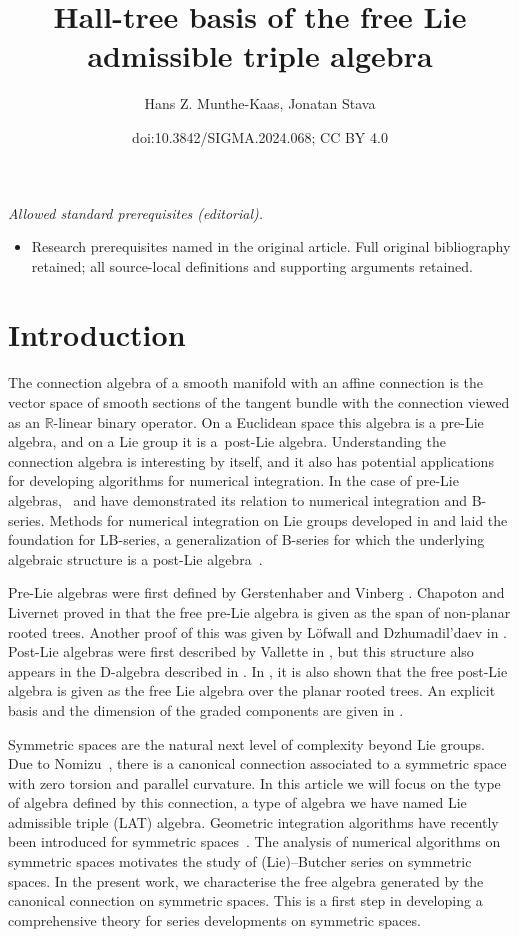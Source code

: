 \documentclass[10pt,a4paper]{amsart}
\title{Hall-tree basis of the free Lie admissible triple algebra}
\author{Hans Z. Munthe-Kaas, Jonatan Stava}
\date{doi:10.3842/SIGMA.2024.068; CC BY 4.0}
\numberwithin{equation}{section}
\begin{document}
\maketitle
\noindent\textit{Allowed standard prerequisites (editorial).}\begin{itemize}
\item Research prerequisites named in the original article. Full original bibliography retained; all source-local definitions and supporting arguments retained.
\end{itemize}\medskip
\section{Introduction}

The connection algebra of a smooth manifold with an affine connection is the vector space of smooth sections of the tangent bundle with the connection viewed as an $\mathbb{R}$-linear binary operator. On a Euclidean space this algebra is a pre-Lie algebra, and on a Lie group it is a~post-Lie algebra. Understanding the connection algebra is interesting by itself, and it also has potential applications for developing algorithms for numerical integration. In the case of pre-Lie algebras,~\cite{B-series_CHV_2010} and \cite{CALAQUE_2011} have demonstrated its relation to numerical integration and B-series. Methods for numerical integration on Lie groups developed in \cite{MK_1995_LB} and \cite{iserles2000lie} laid the foundation for LB-series, a generalization of B-series for which the underlying algebraic structure is a post-Lie algebra~\cite{CEFMK19, KMKL_15}.

Pre-Lie algebras were first defined by Gerstenhaber \cite{Gerstenhaber_63} and Vinberg \cite{Vinberg}. Chapoton and Livernet proved in \cite{Chapoton_and_Livernet_01} that the free pre-Lie algebra is given as the span of non-planar rooted trees. Another proof of this was given by L\"{o}fwall and Dzhumadil'daev in \cite{Dzhumadildeav_and_Lofwall_02}. Post-Lie algebras were first described by Vallette in \cite{BV_2007}, but this structure also appears in the D-algebra described in \cite{MK_Wright_08}. In \cite{MK_Lundervold_2013, BV_2007}, it is also shown that the free post-Lie algebra is given as the free Lie algebra over the planar rooted trees. An explicit basis and the dimension of the graded components are given in \cite{MKK_03}.

Symmetric spaces are the natural next level of complexity beyond Lie groups. Due to Nomizu~\cite{Nomizu_54}, there is a canonical connection associated to a symmetric space with zero torsion and parallel curvature. In this article we will focus on the type of algebra defined by this connection, a type of algebra we have named Lie admissible triple (LAT) algebra. Geometric integration algorithms have recently been introduced for symmetric spaces~\cite{munthekaas24gio}. The analysis of numerical algorithms on symmetric spaces motivates the study of (Lie)--Butcher series on symmetric spaces. In the present work, we characterise the free algebra generated by the canonical connection on symmetric spaces. This is a first step in developing a comprehensive theory for series developments on symmetric spaces.
\end{document}
